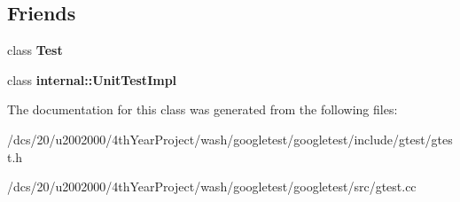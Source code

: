 \subsection*{Friends}
\begin{DoxyCompactItemize}
\item 
\mbox{\label{classtesting_1_1TestSuite_a5b78b1c2e1fa07ffed92da365593eaa4}} 
class {\bfseries Test}
\item 
\mbox{\label{classtesting_1_1TestSuite_acc0a5e7573fd6ae7ad1878613bb86853}} 
class {\bfseries internal\+::\+Unit\+Test\+Impl}
\end{DoxyCompactItemize}


The documentation for this class was generated from the following files\+:\begin{DoxyCompactItemize}
\item 
/dcs/20/u2002000/4th\+Year\+Project/wash/googletest/googletest/include/gtest/gtest.\+h\item 
/dcs/20/u2002000/4th\+Year\+Project/wash/googletest/googletest/src/gtest.\+cc\end{DoxyCompactItemize}
